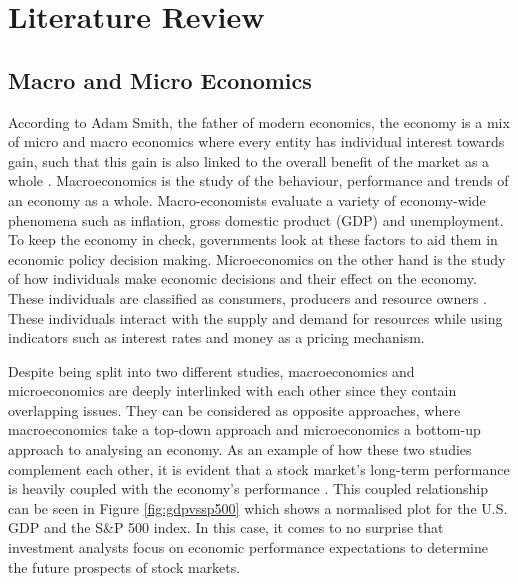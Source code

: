 \documentclass{UoYCSproject}
\begin{document}
\chapter{Literature Review}
\label{cha:literaturereview}

\section{Macro and Micro Economics}
\label{macroandmicro}
According to Adam Smith, the father of modern economics, the economy is a mix of micro and macro economics where every entity has individual interest towards gain, such that this gain is also linked to the overall benefit of the market as a whole \cite{smith1950inquiry}. Macroeconomics is the study of the behaviour, performance and trends of an economy as a whole. Macro-economists evaluate a variety of economy-wide phenomena such as inflation, gross domestic product (GDP) and unemployment. To keep the economy in check, governments look at these factors to aid them in economic policy decision making. Microeconomics on the other hand is the study of how individuals make economic decisions and their effect on the economy. These individuals are classified as consumers, producers and resource owners \cite{dwivedi2002microeconomics}. These individuals interact with the supply and demand for resources while using indicators such as interest rates and money as a pricing mechanism. 

Despite being split into two different studies, macroeconomics and microeconomics are deeply interlinked with each other since they contain overlapping issues. They can be considered as opposite approaches, where macroeconomics take a top-down approach and microeconomics a bottom-up approach to analysing an economy. As an example of how these two studies complement each other, it is evident that a stock market's long-term performance is heavily coupled with the economy's performance \cite{davis2008macroeconomic}. This coupled relationship can be seen in Figure \ref{fig:gdpvssp500} which shows a normalised plot for the U.S. GDP and the S\&P 500 index. In this case, it comes to no surprise that investment analysts focus on economic performance expectations to determine the future prospects of stock markets.
\end{document}
